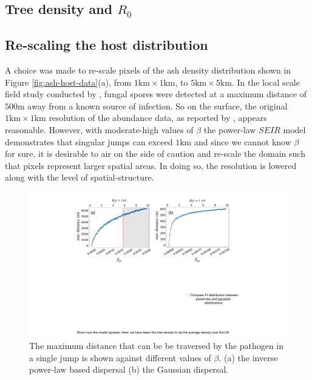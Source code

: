 \subsection{Tree density and $R_0$}
\blindtext

\subsection{Re-scaling the host distribution}
\label{ch6:re-scaling-host-data}

A choice was made to re-scale pixels of the ash density distribution shown in Figure \ref{fig:ash-host-data}(a), from $1\mathrm{km} \times 1 \mathrm{km}$, to $5\mathrm{km} \times 5 \mathrm{km}$. In the local scale field study conducted by \cite{grosdidier2018tracking}, fungal spores were detected at a maximum distance of $500\mathrm{m}$ away from a known source of infection. So on the surface, the original $1\mathrm{km} \times 1 \mathrm{km}$ resolution of the abundance data, as reported by \cite{hill.data}, appears reasonable. However, with moderate-high values of $\beta$ the power-law $SEIR$ model demonstrates that singular jumps can exceed $1\mathrm{km}$ and since we cannot know $\beta$ for sure, it is desirable to air on the side of caution and re-scale the domain such that pixels represent larger spatial areas. In doing so, the resolution is lowered along with the level of spatial-structure. 

\begin{figure}
    \centering
    \includegraphics[scale=0.40]{chapter6/figures/fig5-beta-vs-max_d.pdf}
    \caption{The maximum distance that can be be traversed by the pathogen in a single jump is shown against different values of $\beta$. (a) the inverse power-law based dispersal (b) the Gaussian dispersal.}
    \label{fig:max_dist_vs_R0}
\end{figure}

